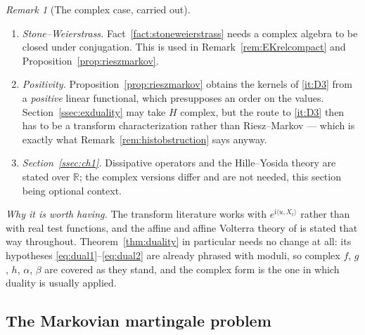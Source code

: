 \documentclass[11pt,a4paper]{article}
\theoremstyle{plain}
\theoremstyle{definition}
\theoremstyle{remark}
\newtheorem{remark}[theorem]{Remark}
\newcommand{\R}{\mathbb{R}}
\newcommand{\ALP}{\cite{ALP19}}
\newcommand{\K}{\mathbb{K}}
\begin{document}
\begin{remark}[The complex case, carried out]
\begin{enumerate}[label=(\roman*)]
    The one place where an inequality is the \emph{subject} rather than a tool is
    Remark~\ref{rem:inequalitystable}, and there $\K = \R$ is not a retreat but
    the hypothesis.
  \item \emph{Stone--Weierstrass.}  Fact~\ref{fact:stoneweierstrass} needs a
    complex algebra to be closed under conjugation.  This is used in
    Remark~\ref{rem:EKrelcompact} and Proposition~\ref{prop:rieszmarkov}.
  \item \emph{Positivity.}  Proposition~\ref{prop:rieszmarkov} obtains the kernels
    of \ref{it:D3} from a \emph{positive} linear functional, which presupposes an
    order on the values.  Section~\ref{ssec:exduality} may take $H$ complex, but
    the route to \ref{it:D3} then has to be a transform characterization rather
    than Riesz--Markov --- which is exactly what
    Remark~\ref{rem:histobstruction} says anyway.
  \item \emph{Section~\ref{ssec:ch1}.}  Dissipative operators and the
    Hille--Yosida theory are stated over $\R$; the complex versions differ and
    are not needed, this section being optional context.
  \end{enumerate}

  \emph{Why it is worth having.}  The transform literature works with
  $e^{\mathrm{i}\langle u, X_t\rangle}$ rather than with real test functions, and
  the affine and affine Volterra theory of \ALP{} is stated that way throughout.
  Theorem~\ref{thm:duality} in particular needs no change at all: its hypotheses
  \eqref{eq:dual1}--\eqref{eq:dual2} are already phrased with moduli, so complex
  $f$, $g$, $h$, $\alpha$, $\beta$ are covered as they stand, and the complex form
  is the one in which duality is usually applied.
\end{remark}

\subsection{The Markovian martingale problem}
\label{ssec:markovMP}
\end{document}
